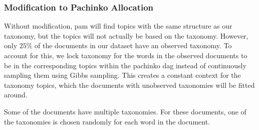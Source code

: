 \subsubsection{Modification to Pachinko Allocation}\label{subsec:mod_pachinko}
Without modification, \gls{pam} will find topics with the same structure as our taxonomy, but the topics will not actually be based on the taxonomy.
However, only $25\%$ of the documents in our dataset have an observed taxonomy.
To account for this, we lock taxonomy for the words in the observed documents to be in the corresponding topics within the pachinko \gls{dag} instead of continuously sampling them using Gibbs sampling.
This creates a constant context for the taxonomy topics, which the documents with unobserved taxonomies will be fitted around.

Some of the documents have multiple taxonomies.
For these documents, one of the taxonomies is chosen randomly for each word in the document.
